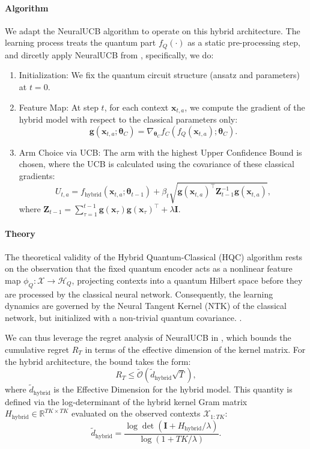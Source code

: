 \documentclass[pdflatex,sn-mathphys-num]{sn-jnl}%
\theoremstyle{thmstyleone}%
\theoremstyle{thmstyletwo}%
\theoremstyle{thmstylethree}%
\newcommand{\xbf}{\mathbf{x}}
\newcommand{\Ibf}{\mathbf{I}}
\newcommand{\Zbf}{\mathbf{Z}}
\newcommand{\gbf}{\mathbf{g}}
\begin{document}
\begin{appendices}
\paragraph{Algorithm} 
We adapt the NeuralUCB algorithm to operate on this hybrid architecture. The learning process treats the quantum part $f_Q(\cdot)$ as a static pre-processing step, and dircetly apply NeuralUCB from \cite{neuralucb}, specifically, we do:
\begin{enumerate}
    \item Initialization: We fix the quantum circuit structure (ansatz and parameters) at $t=0$.
    \item Feature Map: At step $t$, for each context $\xbf_{t,a}$, we compute the gradient of the hybrid model with respect to the classical parameters only:$$\gbf(\xbf_{t,a}; \bm{\theta}_C) = \nabla_{\bm{\theta}_C} f_C(f_Q(\xbf_{t,a}); \bm{\theta}_C).$$
    \item Arm Choice via UCB: The arm with the highest Upper Confidence Bound is chosen, where the UCB is calculated using the covariance of these classical gradients:$$U_{t,a} = f_{\text{hybrid}}(\xbf_{t,a}; \bm{\theta}_{t-1}) + \beta_t \sqrt{\gbf(\xbf_{t,a})^\top \Zbf_{t-1}^{-1} \gbf(\xbf_{t,a})},$$ where $\Zbf_{t-1} = \sum_{\tau=1}^{t-1} \gbf(\xbf_{\tau})\gbf(\xbf_{\tau})^\top + \lambda \Ibf$.
\end{enumerate}






\paragraph{Theory}
The theoretical validity of the Hybrid Quantum-Classical (HQC) algorithm rests on the observation that the fixed quantum encoder acts as a nonlinear feature map $\phi_Q: \mathcal{X} \to \mathcal{H}_Q$, projecting contexts into a quantum Hilbert space before they are processed by the classical neural network. Consequently, the learning dynamics are governed by the Neural Tangent Kernel (NTK) of the classical network, but initialized with a non-trivial quantum covariance. \cite{hybridqcntk}.

We can thus leverage the regret analysis of NeuralUCB in \cite{neuralucb}, which bounds the cumulative regret $R_T$ in terms of the effective dimension of the kernel matrix. For the hybrid architecture, the bound takes the form: $$R_T \leq \tilde{\mathcal{O}}\left(\widetilde{d}_{ \text{hybrid}} \sqrt{T}\right),$$ where $\widetilde{d}_{ \text{hybrid}}$ is the Effective Dimension for the hybrid model. This quantity is defined via the log-determinant of the hybrid kernel Gram matrix $H_{\text{hybrid}} \in \mathbb{R}^{TK \times TK}$ evaluated on the observed contexts $\mathcal{X}_{1:TK}$:$$\widetilde{d}_{\text{hybrid}} = \frac{\log \det(\Ibf + H_{\text{hybrid}} / \lambda)}{\log(1 + TK/\lambda)}.$$


\end{appendices}
\end{document}
